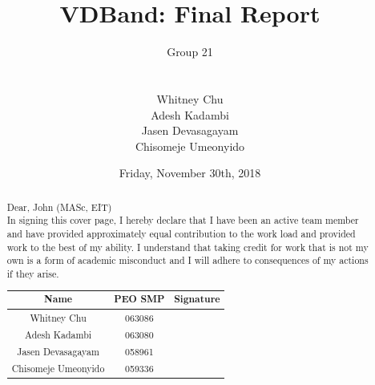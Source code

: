 \documentclass[11.5pt]{article}
\title{  \textbf{VDBand: Final Report}}
\author{
    Group 21\\\\
	\begin{tabular}{c}
	    Whitney Chu\\
    	Adesh Kadambi\\
		Jasen Devasagayam\\
        Chisomeje Umeonyido\\\\
	\end{tabular}

}
\date{Friday, November 30th, 2018}
\begin{document}
\newpage
\renewcommand{\abstractname}{Letter of Transmittal}
\begin{abstract}
\thispagestyle{empty}
 Dear, John (MASc, EIT)\\
 
In signing this cover page, I hereby declare that I have been an active team member and have provided approximately equal contribution to the work load and provided work to the best of my ability. I understand that taking credit for work that is not my own is a form of academic misconduct and I will adhere to consequences of my actions if they arise. 

\begin{table}[H]
	\centering
	\vspace{3mm}
	\begin{tabular}{ccc}
	\hline
		Name & PEO SMP & Signature \\
	\hline
	    \vspace{3mm}
	    Whitney Chu & 063086 &  \\
	    \vspace{3mm}
	    Adesh Kadambi  & 063080 & \\
	    \vspace{3mm}
	    Jasen Devasagayam & 058961 & \\
	    \vspace{3mm}
		Chisomeje Umeonyido & 059336 & \\
	 \hline 
		\end{tabular}
		\label{table:sigs}
\end{table}


\end{abstract}
\end{document}

